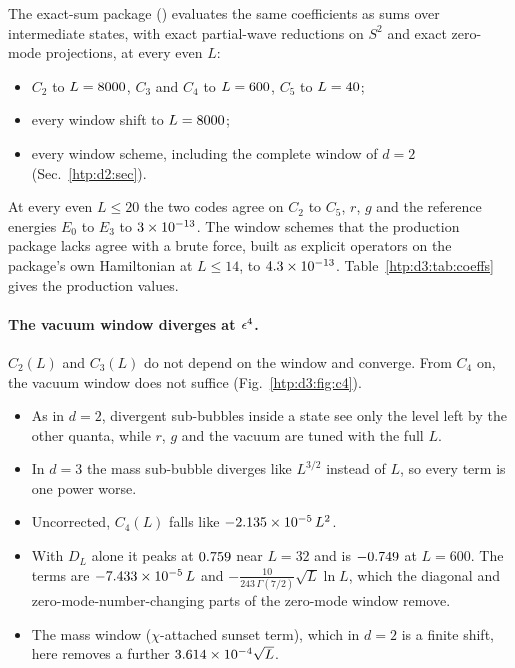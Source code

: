 The exact-sum package () evaluates the same coefficients as sums over intermediate states,
with exact partial-wave reductions on $S^2$ and exact zero-mode projections, at every even $L$:
\begin{itemize}
\item $C_2$ to $L=8000$, $C_3$ and $C_4$ to $L=600$, $C_5$ to $L=40$;
\item every window shift to $L=8000$;
\item every window scheme, including the complete window of $d=2$ (Sec.~\ref{htp:d2:sec}).
\end{itemize}
At every even $L\le20$ the two codes agree on $C_2$ to $C_5$, $r$, $g$ and the reference energies $E_0$ to $E_3$ to
$3\times10^{-13}$. The window schemes that the production package lacks agree with a brute force, built as explicit
operators on the package's own Hamiltonian at $L\le14$, to $4.3\times10^{-13}$. Table~\ref{htp:d3:tab:coeffs} gives the
production values.



\paragraph{The vacuum window diverges at $\epsilon^4$.}
$C_2(L)$ and $C_3(L)$ do not depend on the window and converge. From $C_4$ on, the vacuum window does not suffice
(Fig.~\ref{htp:d3:fig:c4}).
\begin{itemize}
\item As in $d=2$, divergent sub-bubbles inside a state see only the level left by the other quanta, while $r$, $g$ and
 the vacuum are tuned with the full $L$.
\item In $d=3$ the mass sub-bubble diverges like $L^{3/2}$ instead of $L$, so every term is one power worse.
\item Uncorrected, $C_4(L)$ falls like $-2.135\times10^{-5}\,L^2$.
\item With $D_L$ alone it peaks at $0.759$ near $L=32$ and is $-0.749$ at $L=600$. The
 terms are $-7.433\times10^{-5}\,L$ and $-\tfrac{10}{243\,\Gamma(7/2)}\sqrt L\ln L$, which the diagonal and
 zero-mode-number-changing parts of the zero-mode window remove.
\item The mass window ($\chi$-attached sunset term), which in $d=2$ is a finite shift, here removes a further
 $3.614\times10^{-4}\sqrt L$.
\end{itemize}

